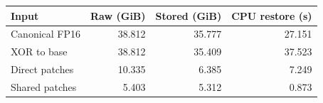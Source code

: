 \begin{tabular}{lrrr}
\toprule
Input & Raw (GiB) & Stored (GiB) & CPU restore (s)\\
\midrule
Canonical FP16 & 38.812 & 35.777 & 27.151\\
XOR to base & 38.812 & 35.409 & 37.523\\
Direct patches & 10.335 & 6.385 & 7.249\\
Shared patches & 5.403 & 5.312 & 0.873\\
\bottomrule
\end{tabular}
